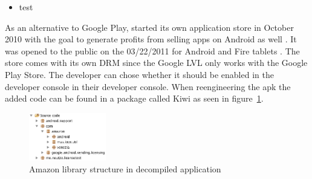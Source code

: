 \begin{itemize}
    \item test
\end{itemize}
As an alternative to Google Play, started its own application store in October 2010 with the goal to generate profits from selling apps on Android as well \cite{amazonBeta}.
It was opened to the public on the 03/22/2011 for Android and Fire tablets \cite{amazonRelease}.
The store comes with its own DRM since the Google LVL only works with the Google Play Store.
The developer can chose whether it should be enabled in the developer console  in their developer console.
When reengineering the \gls{apk} the added code can be found in a package called Kiwi as seen in figure~\ref{fig:amazonFolder}. \cite{amazonDeveloper}
\begin{figure}[h]
    \centering
    \includegraphics[width=0.3\textwidth]{data/amazonFolder.png}
    \caption{Amazon library structure in decompiled application}
    \label{fig:amazonFolder}
\end{figure}
